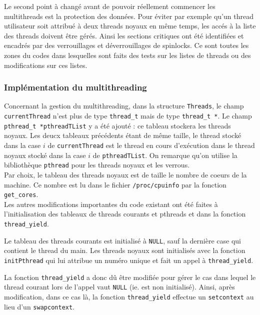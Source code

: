 \documentclass[a4paper,11pt]{article}
\begin{document}
Le second point à changé avant de pouvoir réellement commencer les multithreads est la protection des données. Pour éviter par exemple qu'un thread utilisateur soit attribué à deux threads noyaux en même temps, les accés à la liste des threads doivent être gérés. Ainsi les sections critiques ont été identifiées et encadrés par des verrouillages et déverrouillages de spinlocks. Ce sont toutes les zones du codes dans lesquelles sont faits des tests sur les listes de threads ou des modifications sur ces listes.

\subsubsection*{Implémentation du multithreading}

Concernant la gestion du multithreading, dans la structure \texttt{Threads}, le champ \texttt{currentThread} n'est plus de type \texttt{thread\_t} mais de type \texttt{thread\_t *}. Le champ \texttt{pthread\_t *pthreadTList} y a été ajouté : ce tableau stockera les threads noyaux. Les deucx tableaux précédents étant de même taille, le thread stocké dans la case $i$ de \texttt{currentThread} est le thread en cours d'exécution dans le thread noyaux stocké dans la case $i$ de \texttt{pthreadTList}. On remarque qu'on utilise la bibliothèque \texttt{pthread} pour les threads noyaux et les verrous.\\

Par choix, le tableau des threads noyaux est de taille le nombre de coeurs de la machine. Ce nombre est lu dans le fichier \texttt{/proc/cpuinfo} par la fonction \texttt{get\_cores}.\\

Les autres modifications importantes du code existant ont été faites à l'initialisation des tableaux de threads courants et pthreads et dans la fonction \texttt{thread\_yield}.

Le tableau des threads courants est initialisé à \texttt{NULL}, sauf la dernière case qui contient le thread du main. Les threads noyaux sont initialisés avec la fonction \texttt{initPthread} qui lui attribue un numéro unique et fait un appel à \texttt{thread\_yield}.

La fonction \texttt{thread\_yield} a donc dû être modifiée pour gérer le cas dans lequel le thread courant lors de l'appel vaut \texttt{NULL} (ie. est non initialisé). Ainsi, après modification, dans ce cas là, la fonction \texttt{thread\_yield} effectue un \texttt{setcontext} au lieu d'un \texttt{swapcontext}.
\end{document}
